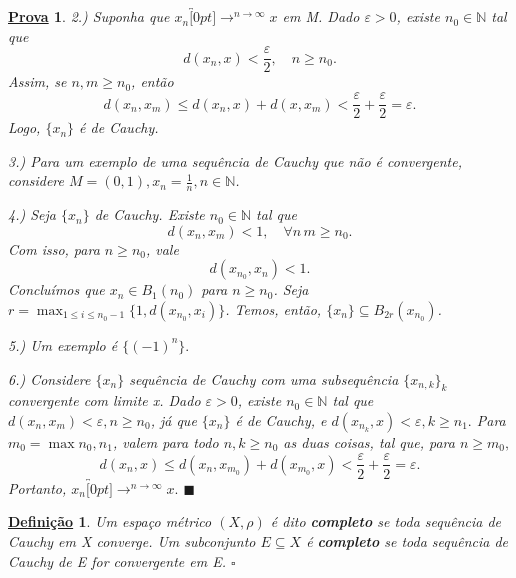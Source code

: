 \documentclass{article}
\newtheorem*{def*}{\underline{Defini\c c\~ao}}
\newtheorem*{proof*}{\underline{Prova}}
\renewcommand\qedsymbol{$\blacksquare$}
\begin{document}
\begin{proof*}
  2.) Suponha que \(x_{n}\overbracket[0pt]{\longrightarrow}^{n\to \infty}x\) em M. Dado \(\varepsilon > 0\), existe \(n_{0}\in \mathbb{N}\) tal que 
    \[
      d(x_{n}, x) < \frac{\varepsilon }{2},\quad n\geq n_{0}.
    \]
  Assim, se \(n, m\geq n_{0}\), então 
    \[
      d(x_{n}, x_{m})\leq d(x_{n}, x) + d(x, x_{m}) < \frac{\varepsilon }{2}+\frac{\varepsilon }{2}=\varepsilon .
    \]
  Logo, \(\{x_{n}\}\) é de Cauchy. 

  3.) Para um exemplo de uma sequência de Cauchy que não é convergente, considere \(M=(0, 1), x_{n}=\frac{1}{n},n\in \mathbb{N}\).

  4.) Seja \(\{x_{n}\}\) de Cauchy. Existe \(n_{0}\in \mathbb{N}\) tal que 
    \[
      d(x_{n}, x_{m}) < 1,\quad \forall n\, m\geq n_{0}.
    \]
  Com isso, para \(n\geq n_{0}\), vale 
    \[
      d(x_{n_{0}}, x_{n}) < 1.
    \]
  Concluímos que \(x_{n}\in B_{1}(n_{0})\) para \(n\geq n_{0}\). Seja \(r = \max_{1\leq i\leq n_{0}-1}\{1, d(x_{n_{0}}, x_{i})\}\). Temos, então,
 \(\{x_{n}\}\subseteq{B_{2r}(x_{n_{0}})}\).

  5.) Um exemplo é \(\{(-1)^{n}\}.\)

  6.) Considere \(\{x_{n}\}\) sequência de Cauchy com uma subsequência \(\{x_{n, k}\}_{k}\) convergente com limite x.
Dado \(\varepsilon >0\), existe \(n_{0}\in \mathbb{N}\) tal que \(d(x_{n}, x_{m}) < \varepsilon , n\geq n_{0}\), já que \(\{x_{n}\}\) é de Cauchy,
e \(d(x_{n_{k}}, x) < \varepsilon , k\geq n_{1}.\) Para \(m_{0}=\max{n_{0}, n_{1}}\), valem para
todo \(n, k\geq n_{0}\) as duas coisas, tal que, para \(n\geq m_{0},\)
  \[
    d(x_{n}, x)\leq d(x_{n}, x_{m_{0}}) + d(x_{m_{0}}, x) < \frac{\varepsilon }{2} + \frac{\varepsilon }{2} = \varepsilon .
  \]
  Portanto, \(x_{n}\overbracket[0pt]{\longrightarrow}^{n\to \infty}x.\)
  \qedsymbol
\end{proof*}
\begin{def*}
  Um espaço métrico \((X, \rho )\) é dito \textbf{completo} se toda sequência de Cauchy em X converge. Um subconjunto \(E\subseteq{X}\) é \textbf{completo} se toda sequência de Cauchy de E for convergente em E. \(\square\)
\end{def*}
\end{document}
